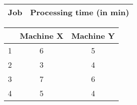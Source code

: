 \begin{center}
\begin{table}[H]
    \centering
    \begin{tabular}[12pt]{cc}
    \hline
{Job} &  {Processing time (in min)} \\ \hline
    \end{tabular}
    
    \begin{tabular}[12pt]{c c c }
          & Machine X & Machine Y \\ \hline
1 & 6 & 5 \\ \hline
2 & 3 & 4 \\ \hline
3 & 7 & 6 \\ \hline
4 & 5 & 4 \\ \hline
    \end{tabular}
\end{table}
\end{center}